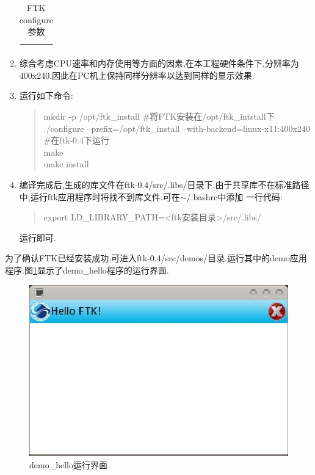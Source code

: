 \documentclass[12pt,a4paper,titlepage]{article}
\begin{document}
\begin{enumerate}
\begin{table}[!bhtp]
\begin{tabular}{|p{}|p{}|}
\begin{itemize}
\end{itemize}\\\hline
\end{tabular}
\caption{FTK configure参数\label{ftk_cfg}}
\end{table}
\item 综合考虑CPU速率和内存使用等方面的因素,在本工程硬件条件下,分辨率为400x240.因此在PC机上保持同样分辨率以达到同样的显示效果.
\item 运行如下命令:
\begin{verse}
mkdir -p /opt/ftk\_install \#将FTK安装在/opt/ftk\_intstall下\\
./configure --prefix=/opt/ftk\_install --with-backend=linux-x11:400x240 \#在ftk-0.4下运行\\
make\\
make install\\
\end{verse}
\item 编译完成后,生成的库文件在ftk-0.4/src/.libs/目录下.由于共享库不在标准路径中,运行ftk应用程序时将找不到库文件.可在$\sim$/.bashrc中添加
一行代码:
\begin{verse}
export LD\_LIBRARY\_PATH=<ftk安装目录>/src/.libs/
\end{verse}
运行即可.
\end{enumerate}
为了确认FTK已经安装成功,可进入ftk-0.4/src/demos/目录.运行其中的demo应用程序.图\ref{ftk_hi}显示了demo\_hello程序的运行界面.
\begin{figure}[!bthp]
\centering
\includegraphics{pic/f_ftk_hello.eps}
\caption{demo\_hello运行界面\label{ftk_hi}}
\end{figure}
\end{document}
